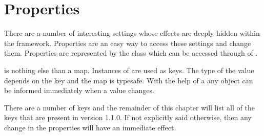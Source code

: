 \section{Properties}
There are a number of interesting settings whose effects are deeply hidden within the framework. Properties are an easy way to access these settings and change them. Properties are represented by the class  which can be accessed through  of .

 is nothing else than a map. Instances of  are used as keys. The type of the value depends on the key and the map is typesafe. With the help of a  any object can be informed immediately when a value changes.

There are a number of keys and the remainder of this chapter will list all of the keys that are present in version 1.1.0. If not explicitly said otherwise, then any change in the properties will have an immediate effect.


